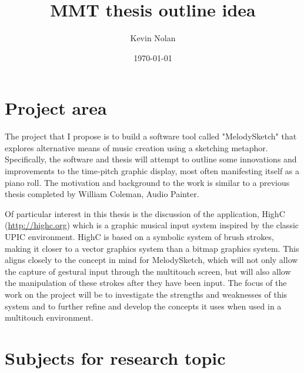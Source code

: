 \documentclass[a4paper,twoside,twocolumn]{article}
\author{Kevin Nolan}
\date{\today}
\title{MMT thesis outline idea}
\begin{document}
\maketitle

\section{Project area}
\label{sec:org6264e99}
The project that I propose is to build a software tool called "MelodySketch" that explores alternative means of music creation using a sketching metaphor. Specifically, the software and thesis will attempt to outline some innovations and improvements to the time-pitch graphic display, most often manifesting itself as a piano roll. The motivation and background to the work is similar to a previous thesis completed by William Coleman, Audio Painter. 

Of particular interest in this thesis is the discussion of the application, HighC (\url{http://highc.org}) which is a graphic musical input system inspired by the classic UPIC environment. HighC is based on a symbolic system of brush strokes, making it closer to a vector graphics system than a bitmap graphics system. This aligns closely to the concept in mind for MelodySketch, which will not only allow the capture of gestural input through the multitouch screen, but will also allow the manipulation of these strokes after they have been input. The focus of the work on the project will be to investigate the strengths and weaknesses of this system and to further refine and develop the concepts it uses when used in a multitouch environment.  


\section{Subjects for research topic}
\label{sec:orgcdbd972}
\end{document}
